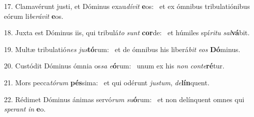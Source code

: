 17. Clamavérunt justi, et Dóminus exau\textit{dí}\textit{vit} \textbf{e}os: \ast\  et ex ómnibus tribulatiónibus eórum li\textit{be}\textit{rá}\textit{vit} \textbf{e}os.\

18. Juxta est Dóminus iis, qui tribulá\textit{to} \textit{sunt} \textbf{cor}de: \ast\  et húmiles spí\textit{ri}\textit{tu} \textit{sal}\textbf{vá}bit.\

19. Multæ tribulatió\textit{nes} \textit{jus}\textbf{tó}rum: \ast\  et de ómnibus his liberá\textit{bit} \textit{e}\textit{os} \textbf{Dó}minus.\

20. Custódit Dóminus ómnia os\textit{sa} \textit{e}\textbf{ó}rum: \ast\  unum ex his \textit{non} \textit{con}\textit{te}\textbf{ré}tur.\

21. Mors pecca\textit{tó}\textit{rum} \textbf{pés}sima: \ast\  et qui odérunt \textit{jus}\textit{tum}, \textit{de}\textbf{lín}quent.\

22. Rédimet Dóminus ánimas servó\textit{rum} \textit{su}\textbf{ó}rum: \ast\  et non delínquent omnes qui \textit{spe}\textit{rant} \textit{in} \textbf{e}o.\

